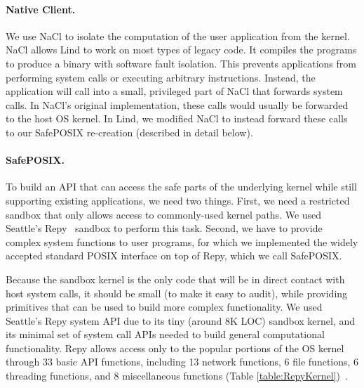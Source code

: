 \paragraph{Native Client.}
We use NaCl to isolate the computation of the user application
from the kernel. NaCl allows Lind to work on most types of legacy code.
It compiles the programs to produce a binary with software fault isolation.
This prevents applications from performing system calls
or executing arbitrary instructions.
Instead, the application will call into a small, privileged
part of NaCl that forwards system calls. In NaCl's original implementation,
these calls would usually be forwarded to the host OS kernel. In Lind, we
modified NaCl to instead forward these calls to our SafePOSIX re-creation 
(described in detail below).

\paragraph{SafePOSIX.}

To build an API that can access the safe parts of the underlying kernel while
still supporting existing applications, we need two things. First, we need a
restricted sandbox that only allows access to commonly-used kernel paths. We
used Seattle's Repy~\cite{Repy-10} sandbox to perform this task. Second, we
have to provide complex system functions to user programs,
for which we implemented the widely accepted standard POSIX interface on top of Repy, 
which we call SafePOSIX. 

Because the sandbox kernel is the only code that will be in direct contact with host
system calls, it should be small (to make it easy to audit), while providing
primitives that can be used to build more complex functionality.
We used Seattle's Repy system API due to its tiny (around 8K LOC) sandbox
kernel, and its minimal set of system call APIs needed to build general
computational functionality. Repy allows access only to the popular portions of
the OS kernel through 33 basic API functions, including 13 network functions, 6
file functions, 6 threading functions, and 8 miscellaneous functions (Table
\ref{table:RepyKernel})~\cite{Repy-10, RepyKernel}.

